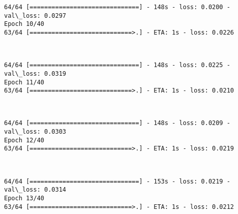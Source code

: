 \documentclass[11pt]{article}
\begin{document}
    \begin{Verbatim}[commandchars=\\\{\}]
64/64 [==============================] - 148s - loss: 0.0200 - val\_loss: 0.0297
Epoch 10/40
63/64 [============================>.] - ETA: 1s - loss: 0.0226
    \end{Verbatim}

    \begin{center}
    \end{center}
    { \hspace*{\fill} \\}
    
    \begin{Verbatim}[commandchars=\\\{\}]
64/64 [==============================] - 148s - loss: 0.0225 - val\_loss: 0.0319
Epoch 11/40
63/64 [============================>.] - ETA: 1s - loss: 0.0210
    \end{Verbatim}

    \begin{center}
    \end{center}
    { \hspace*{\fill} \\}
    
    \begin{Verbatim}[commandchars=\\\{\}]
64/64 [==============================] - 148s - loss: 0.0209 - val\_loss: 0.0303
Epoch 12/40
63/64 [============================>.] - ETA: 1s - loss: 0.0219
    \end{Verbatim}

    \begin{center}
    \end{center}
    { \hspace*{\fill} \\}
    
    \begin{Verbatim}[commandchars=\\\{\}]
64/64 [==============================] - 153s - loss: 0.0219 - val\_loss: 0.0314
Epoch 13/40
63/64 [============================>.] - ETA: 1s - loss: 0.0212
    \end{Verbatim}

    \begin{center}
    \end{center}
    { \hspace*{\fill} \\}
    
\end{document}
